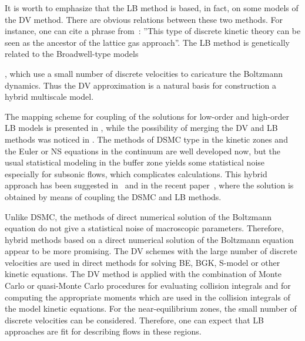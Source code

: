 \documentclass[]{elsarticle} %
\begin{document}
It is worth to emphasize that the LB method is based, in fact, on some models of the DV method.
There are obvious relations between these two methods. For instance, one can cite a phrase from~\cite{Rivet2001}:
''This type of discrete kinetic theory can be seen as the ancestor of the lattice gas approach''.
The LB method is genetically related to the Broadwell-type models~{\cite{Broadwell1964shock, Gatignol1975},
which use a small number of discrete velocities to caricature the Boltzmann dynamics.
Thus the DV approximation is a natural basis for construction a hybrid multiscale model.

The mapping scheme for coupling of the solutions for low-order and high-order LB models is presented in \cite{Meng2011},
while the possibility of merging the DV and LB methods was noticed in \cite{Succi2016}.
The methods of DSMC type in the kinetic zones and the Euler or NS equations in the continuum are well developed now,
but the usual statistical modeling in the buffer zone yields some statistical noise especially for subsonic flows, which complicates calculations.
This hybrid approach has been suggested in~\cite{Staso2016short, Staso2016long} and in the recent paper~\cite{Staso2018},
where the solution is obtained by means of coupling the DSMC and LB methods.



Unlike DSMC, the methods of direct numerical solution of the Boltzmann equation do not give a statistical noise of macroscopic parameters.
Therefore, hybrid methods based on a direct numerical solution of the Boltzmann equation appear to be more promising.
The DV schemes with the large number of discrete velocities are used in direct methods for solving BE, BGK, S-model or other kinetic equations.
The DV method is applied with the combination of Monte Carlo or quasi-Monte Carlo procedures for evaluating collision integrals
and for computing the appropriate moments which are used in the collision integrals of the model kinetic equations.
For the near-equilibrium zones, the small number of discrete velocities can be considered.
Therefore, one can expect that LB approaches are fit for describing flows in these regions.

}
\end{document}
